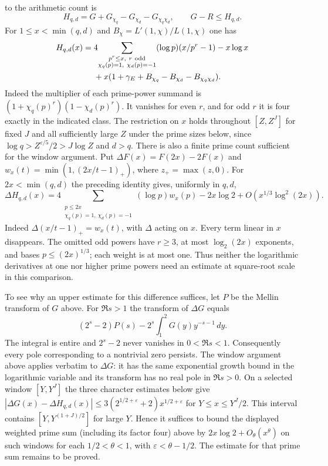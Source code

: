 \documentclass[11pt]{amsart}
\theoremstyle{definition}
\theoremstyle{remark}
\begin{document}
to the arithmetic count is
\[
 H_{q,d}=G+G_{\chi_q}-G_{\chi_d}-G_{\chi_q\chi_d},
 \qquad G-R\le H_{q,d}.
\]
For $1\le x<\min(q,d)$ and $B_\chi=L'(1,\chi)/L(1,\chi)$ one has
\[
 \begin{aligned}
 H_{q,d}(x)={}&4\!\sum_{\substack{p^r\le x,\ r\ {\rm odd}\\
                 \chi_q(p)=1,\ \chi_d(p)=-1}}
           (\log p)(x/p^r-1)-x\log x\\
 &+x(1+\gamma_E+B_{\chi_q}-B_{\chi_d}-B_{\chi_q\chi_d}).
 \end{aligned}
\]
Indeed the multiplier of each prime-power summand is
$(1+\chi_q(p)^r)(1-\chi_d(p)^r)$. It vanishes for even $r$,
and for odd $r$ it is four exactly in the indicated class. The
restriction on $x$ holds throughout $[Z,Z^J]$ for fixed $J$ and
all sufficiently large $Z$ under the prime sizes below, since
$\log q>Z^{\varepsilon/5}/2>J\log Z$ and $d>q$. There is also a finite prime count sufficient for the window
argument. Put $\Delta F(x)=F(2x)-2F(x)$ and
$w_x(t)=\min(1,(2x/t-1)_+)$, where $z_+=\max(z,0)$.
For $2x<\min(q,d)$ the preceding identity gives, uniformly in $q,d$,
\[
 \Delta H_{q,d}(x)=
 4\!\sum_{\substack{p\le2x\\ \chi_q(p)=1,\ \chi_d(p)=-1}}
 (\log p)w_x(p)-2x\log 2+O(x^{1/3}\log^2(2x)).
\]
Indeed $\Delta(x/t-1)_+=w_x(t)$, with $\Delta$ acting on $x$.
Every term linear in $x$ disappears. The omitted odd powers have
$r\ge3$, at most $\log_2(2x)$ exponents, and bases $p\le(2x)^{1/3}$;
each weight is at most one. Thus neither the logarithmic derivatives
at one nor higher prime powers need an estimate at square-root scale
in this comparison.

To see why an upper estimate for this difference suffices, let $P$
be the Mellin transform of $G$ above. For $\Re s>1$ the transform of
$\Delta G$ equals
\[
 (2^s-2)P(s)-2^s\int_1^2 G(y)y^{-s-1}\,dy .
\]
The integral is entire and $2^s-2$ never vanishes in $0<\Re s<1$.
Consequently every pole corresponding to a nontrivial zero persists.
The window argument above applies verbatim to $\Delta G$: it has
the same exponential growth bound in the logarithmic variable and
its transform has no real pole in $\Re s>0$. On a selected window
$[Y,Y^J]$ the three character estimates below give
$|\Delta G(x)-\Delta H_{q,d}(x)|\le
3(2^{1/2+\varepsilon}+2)x^{1/2+\varepsilon}$ for $Y\le x\le Y^J/2$.
This interval contains $[Y,Y^{(1+J)/2}]$ for large $Y$.
Hence it suffices to bound the displayed weighted prime sum
(including its factor four) above by $2x\log 2+O_\theta(x^\theta)$
on such windows for each $1/2<\theta<1$, with
$\varepsilon<\theta-1/2$. The estimate for that prime sum remains
to be proved.
\end{document}
